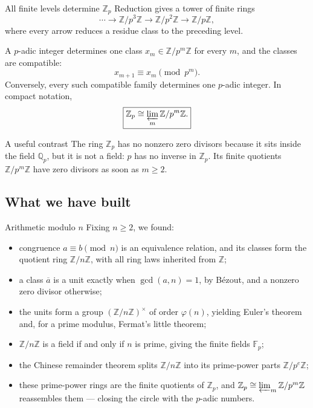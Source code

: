 \documentclass[aspectratio=169,11pt]{beamer}
\newcommand{\Z}{\mathbb Z}
\newcommand{\Q}{\mathbb Q}
\begin{document}
\begin{frame}{All finite levels determine \(\Z_p\)}
  Reduction gives a tower of finite rings
  \[
    \cdots\longrightarrow\Z/p^3\Z
      \longrightarrow\Z/p^2\Z
      \longrightarrow\Z/p\Z,
  \]
  where every arrow reduces a residue class to the preceding level.

  A \(p\)-adic integer determines one class \(x_m\in\Z/p^m\Z\) for
  every \(m\), and the classes are compatible:
  \[
    x_{m+1}\equiv x_m\pmod{p^m}.
  \]
  Conversely, every such compatible family determines one \(p\)-adic
  integer.  In compact notation,
  \[
    \boxed{\Z_p\cong\varprojlim_m\Z/p^m\Z.}
  \]

  \begin{alertblock}{A useful contrast}
    The ring \(\Z_p\) has no nonzero zero divisors because it sits inside
    the field \(\Q_p\), but it is not a field: \(p\) has no inverse in
    \(\Z_p\).  Its finite quotients \(\Z/p^m\Z\) have zero divisors as
    soon as \(m\ge2\).
  \end{alertblock}
\end{frame}

\subsection{What we have built}

\begin{frame}{Arithmetic modulo \(n\)}
  \small
  Fixing \(n\ge2\), we found:
  \begin{itemize}
    \item congruence \(a\equiv b\pmod n\) is an equivalence relation, and its
      classes form the quotient ring \(\Z/n\Z\), with all ring laws inherited
      from \(\Z\);
    \item a class \(\overline a\) is a unit exactly when \(\gcd(a,n)=1\), by
      B\'ezout, and a nonzero zero divisor otherwise;
    \item the units form a group \((\Z/n\Z)^\times\) of order \(\varphi(n)\),
      yielding Euler's theorem and, for a prime modulus, Fermat's little
      theorem;
    \item \(\Z/n\Z\) is a field if and only if \(n\) is prime, giving the
      finite fields \(\mathbb F_p\);
    \item the Chinese remainder theorem splits \(\Z/n\Z\) into its
      prime-power parts \(\Z/p^{e}\Z\);
    \item these prime-power rings are the finite quotients of \(\Z_p\), and
      \(\Z_p\cong\varprojlim_m\Z/p^m\Z\) reassembles them --- closing the
      circle with the \(p\)-adic numbers.
  \end{itemize}
\end{frame}
\end{document}
